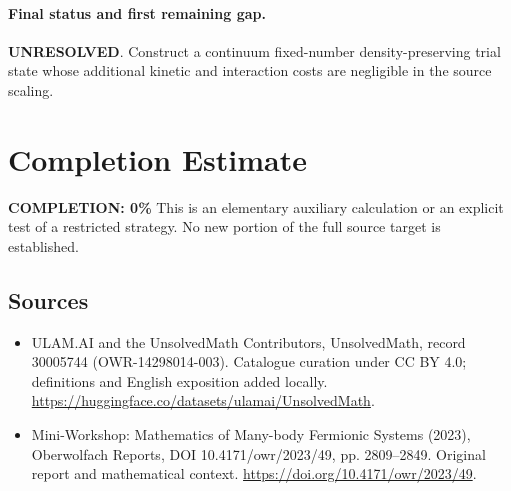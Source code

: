 \documentclass[11pt]{article}
\begin{document}
\paragraph{Final status and first remaining gap.}
\textbf{UNRESOLVED}. Construct a continuum fixed-number density-preserving trial state whose additional kinetic and interaction costs are negligible in the source scaling.

\section{Completion Estimate}
\noindent\textbf{COMPLETION: 0\%}
This is an elementary auxiliary calculation or an explicit test of a restricted strategy. No new portion of the full source target is established.

\subsection{Sources}
\begin{itemize}
\item[\hypertarget{source:30005744:1}{S1}] ULAM.AI and the UnsolvedMath Contributors, UnsolvedMath, record 30005744 (OWR-14298014-003). Catalogue curation under CC BY 4.0; definitions and English exposition added locally.
\url{https://huggingface.co/datasets/ulamai/UnsolvedMath}.
\item[\hypertarget{source:30005744:2}{S2}] Mini-Workshop: Mathematics of Many-body Fermionic Systems (2023), Oberwolfach Reports, DOI 10.4171/owr/2023/49, pp. 2809--2849. Original report and mathematical context.
\url{https://doi.org/10.4171/owr/2023/49}.
\end{itemize}
\label{end:30005744}
\end{document}
